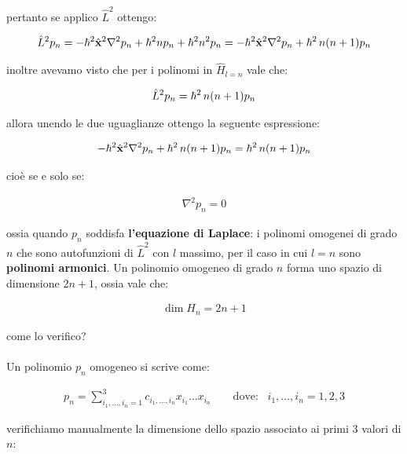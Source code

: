 	pertanto se applico $\hat{L}^2$ ottengo:
	
\begin{align*}
	\hat{L}^2 p_n = - \hbar^2 \hat{\vb{x}}^2 \nabla^2 p_n + \hbar^2 n p_n + \hbar^2 n^2 p_n = - \hbar^2 \hat{\vb{x}}^2 \nabla^2 p_n + \hbar^2 \, n \qty( n + 1) p_n 
\end{align*}

	inoltre avevamo visto che per i polinomi in $\hat{H}_{l = n}$ vale che:
	
\begin{align*}
	\hat{L}^2 p_n  = \hbar^2 \, n \qty(n + 1) p_n
\end{align*}

	allora unendo le due uguaglianze ottengo la seguente espressione:
	
\begin{align*}
	- \hbar^2 \hat{\vb{x}}^2 \nabla^2 p_n + \hbar^2 \, n \qty( n + 1) p_n  = \hbar^2 \, n \qty(n + 1) p_n
\end{align*}

	cioè se e solo se:
	
\begin{align*}
	\nabla^2 p_n = 0
\end{align*}

	ossia quando $p_n$ soddisfa \textbf{l'equazione di Laplace}: i polinomi omogenei di grado $n$ che sono autofunzioni di $\hat{L}^2$ con $l$ massimo, per il caso in cui $l = n$ sono \textbf{polinomi armonici}. Un polinomio omogeneo di grado $n$ forma uno spazio di dimensione $2n + 1$, ossia vale che:

\begin{align*}
	\dim H_n = 2n + 1
\end{align*}

	come lo verifico?
	\\
	\\
	Un polinomio $p_n$ omogeneo si scrive come:
	
\begin{align*}
	p_n = \sum_{i_1, \dots, i_n = 1}^{3} c_{i_1, \dots, i_n} x_{i_1} \dots x_{i_n}  \qquad \text{dove}: \,\,\,\, i_1, \dots, i_n = 1, 2, 3
\end{align*}

	verifichiamo manualmente la dimensione dello spazio associato ai primi $3$ valori di $n$:
	

